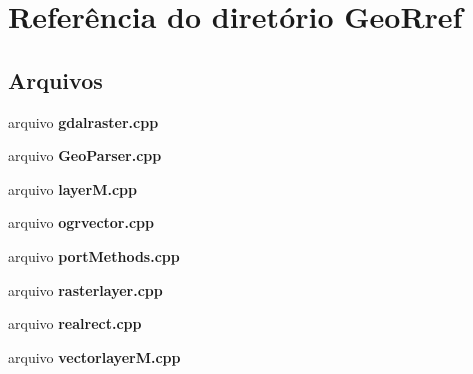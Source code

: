 \section{Referência do diretório Geo\+Rref}
\label{dir_b5680708a4cb49d7ad5b73658f32891f}
\subsection*{Arquivos}
\begin{DoxyCompactItemize}
\item 
arquivo {\bf gdalraster.\+cpp}
\item 
arquivo {\bf Geo\+Parser.\+cpp}
\item 
arquivo {\bf layer\+M.\+cpp}
\item 
arquivo {\bf ogrvector.\+cpp}
\item 
arquivo {\bf port\+Methods.\+cpp}
\item 
arquivo {\bf rasterlayer.\+cpp}
\item 
arquivo {\bf realrect.\+cpp}
\item 
arquivo {\bf vectorlayer\+M.\+cpp}
\end{DoxyCompactItemize}
